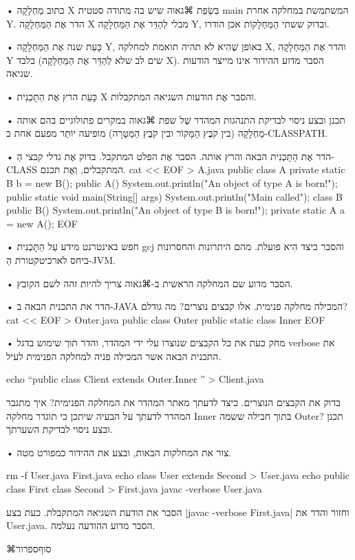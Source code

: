• כתוב מַחְלָקָה X בִּשְׂפַת ⌘גאוה שיש בה מתודה סטטית main המשתמשת במחלקה אחרת
Y. הדר אֶת הַמַּחְלָקָה X מבלי לְהַדֵּר אֶת הַמַּחְלָקָה Y, ובדוק ששתי
הַמַּחְלָקוֹת אכן הודרו.

• כָּעֵת שנה אֶת הַמַּחְלָקָה Y, באופן שֶׁהִיא לֹא תהיה תואמת למחלקה X, והדר
אֶת הַמַּחְלָקָה Y בלבד (שים לב שלא לְהַדֵּר אֶת הַמַּחְלָקָה X). הסבר מדוע
ההידור אינו מייצר הודעות שגיאה.

• כָּעֵת הרץ אֶת הַתָּכְנִית X והסבר אֶת הודעות השגיאה המתקבלות.

• תכנן ובצע ניסוי לבדיקת התנהגות המהדר שֶׁל שפת ⌘גאוה במקרים פתולוגיים בהם אותה
מַחְלָקָה (בין קֹבֶץ הַמָּקוֹר ובין קֹבֶץ הַמַּטָּרָה) מופיעה יוֹתֵר מפעם אחת
ב-CLASSPATH.


• הדר אֶת הַתָּכְנִית הבאה והרץ אותה. הסבר אֶת הפלט המתקבל. בדוק אֶת גדלי קבצי
הַ-CLASS המתקבלים, וְאֶת תכנם.
cat << EOF > A.java
public class A {
   private static B b = new B();
   public A() { System.out.println("An object of type A is born!"); }
   public static void main(String[] args) {
     System.out.println("Main called\n");
   }
}
class B {
  public B() { System.out.println("An object of type B is born!"); }
  private static A a = new A();
}
EOF
\END

• חפש באינטרנט מידע עַל הַתָּכְנִית gcj והסבר כיצד הִיא פועלת. מהם היתרונות
  והחסרונות ביחס לארכיטקטורת הַ-JVM.

• הסבר מדוע שם המחלקה הראשית ב-⌘גאוה צריך להיות זהה לשם הקובץ.

• הדר את התכנית הבאה ב-JAVA המכילה מחלקה פנימית. אלו קבצים נוצרים? מה גודלם?
cat << EOF > Outer.java
public class Outer {
  public static class Inner {
  }
}
EOF
\END





• מחק כעת את כל הקבצים שנוצרו עלי ידי המהדר, והדר תוך שימוש בדגל verbose את
התכנית הבאה אשר המכילה פניה למחלקה הפנימית לעיל.

echo “public class Client extends Outer.Inner { }” > Client.java
\END


 בדוק את הקבצים הנוצרים. כיצד לדעתך מאתר המהדר את המחלקה הפנימית? איך מתגבר
המהדר לדעתך על הבעיה שיתכן כי תוגדר מחלקה Inner בתוך חבילה ששמה Outer? תכנן
ובצע ניסוי לבדיקת השערתך. 

• צור את המחלקות הבאות, ובצע את ההידור כמפורט מטה.

rm -f User.java First.java 
echo class User extends Second {} > User.java
echo public class First {} class Second{} > First.java
javac -verbose User.java
\END


הסבר את הודעת השגיאה המתקבלת. כעת בצע
\E|javac -verbose First.java|
 וחזור והדר את User.java. 
הסבר מדוע ההודעה נעלמה.

⌘סוף{ספרור}
